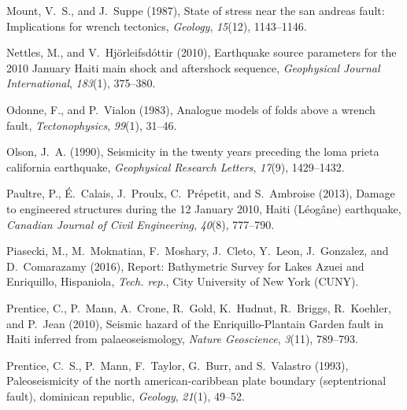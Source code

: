 \documentclass[linenumbers,draft]{agujournal}
\begin{document}
\begin{thebibliography}{62}
Mount, V.~S., and J.~Suppe (1987), State of stress near the san andreas fault:
  Implications for wrench tectonics, \textit{Geology}, \textit{15}(12),
  1143--1146.

Nettles, M., and V.~Hj{\"o}rleifsd{\'o}ttir (2010), Earthquake source
  parameters for the 2010 {January Haiti} main shock and aftershock sequence,
  \textit{Geophysical Journal International}, \textit{183}(1), 375--380.

Odonne, F., and P.~Vialon (1983), Analogue models of folds above a wrench
  fault, \textit{Tectonophysics}, \textit{99}(1), 31--46.

Olson, J.~A. (1990), Seismicity in the twenty years preceding the loma prieta
  california earthquake, \textit{Geophysical Research Letters}, \textit{17}(9),
  1429--1432.

Paultre, P., {\'E}.~Calais, J.~Proulx, C.~Pr{\'e}petit, and S.~Ambroise (2013),
  {Damage to engineered structures during the 12 January 2010, Haiti
  (L{\'e}og{\^a}ne) earthquake}, \textit{Canadian Journal of Civil
  Engineering}, \textit{40}(8), 777--790.

Piasecki, M., M.~Moknatian, F.~Moshary, J.~Cleto, Y.~Leon, J.~Gonzalez, and
  D.~Comarazamy (2016), Report: {Bathymetric Survey for Lakes Azuei and
  Enriquillo, Hispaniola}, \textit{Tech. rep.}, City University of New York
  (CUNY).

Prentice, C., P.~Mann, A.~Crone, R.~Gold, K.~Hudnut, R.~Briggs, R.~Koehler, and
  P.~Jean (2010), Seismic hazard of the {Enriquillo-Plantain Garden fault in
  Haiti} inferred from palaeoseismology, \textit{Nature Geoscience},
  \textit{3}(11), 789--793.

Prentice, C.~S., P.~Mann, F.~Taylor, G.~Burr, and S.~Valastro (1993),
  Paleoseismicity of the north american-caribbean plate boundary (septentrional
  fault), dominican republic, \textit{Geology}, \textit{21}(1), 49--52.


\end{thebibliography}
\end{document}
